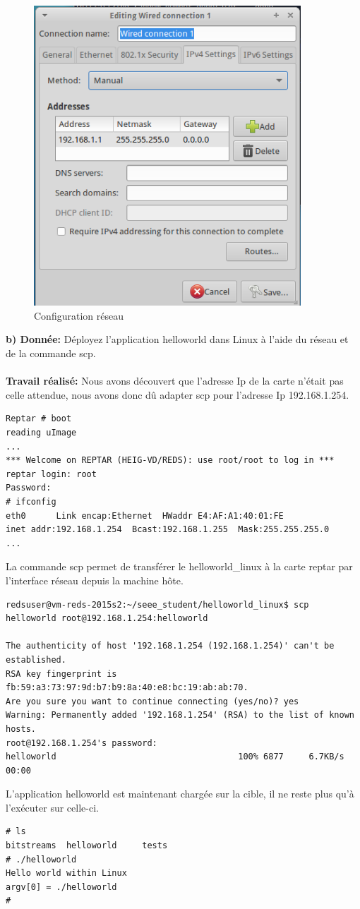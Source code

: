 \begin{figure}[H]
	\begin{center}
		\includegraphics[width=10cm]{img/ipConfig.png}
		\caption{Configuration réseau}
		\label{ipConfig}
	\end{center}
\end{figure}
\textbf{b) Donnée: }Déployez l'application helloworld dans Linux à l'aide du réseau et de la commande scp.\\\\
\textbf{Travail réalisé: } Nous avons découvert que l'adresse Ip de la carte n'était pas celle attendue, nous avons donc dû adapter scp pour l'adresse Ip 192.168.1.254.
\begin{lstlisting}
Reptar # boot
reading uImage
...
*** Welcome on REPTAR (HEIG-VD/REDS): use root/root to log in ***
reptar login: root
Password: 
# ifconfig
eth0      Link encap:Ethernet  HWaddr E4:AF:A1:40:01:FE  
inet addr:192.168.1.254  Bcast:192.168.1.255  Mask:255.255.255.0
...
\end{lstlisting}
La commande scp permet de transférer le helloworld\_linux à la carte reptar par l'interface réseau depuis la machine hôte.
\begin{lstlisting}
redsuser@vm-reds-2015s2:~/seee_student/helloworld_linux$ scp helloworld root@192.168.1.254:helloworld

The authenticity of host '192.168.1.254 (192.168.1.254)' can't be established.
RSA key fingerprint is fb:59:a3:73:97:9d:b7:b9:8a:40:e8:bc:19:ab:ab:70.
Are you sure you want to continue connecting (yes/no)? yes
Warning: Permanently added '192.168.1.254' (RSA) to the list of known hosts.
root@192.168.1.254's password: 
helloworld                                    100% 6877     6.7KB/s   00:00    
\end{lstlisting}
L'application helloworld est maintenant chargée sur la cible, il ne reste plus qu'à l'exécuter sur celle-ci.
\begin{lstlisting}
# ls
bitstreams  helloworld     tests
# ./helloworld 
Hello world within Linux
argv[0] = ./helloworld
#
\end{lstlisting}
